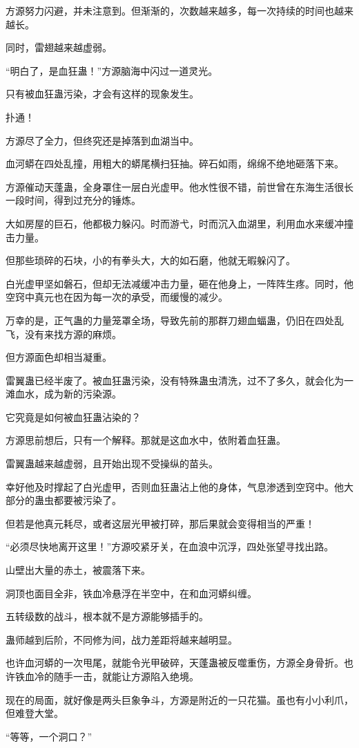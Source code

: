 \begin{this_body}
方源努力闪避，并未注意到。但渐渐的，次数越来越多，每一次持续的时间也越来越长。

同时，雷翅越来越虚弱。

“明白了，是血狂蛊！”方源脑海中闪过一道灵光。

只有被血狂蛊污染，才会有这样的现象发生。

扑通！

方源尽了全力，但终究还是掉落到血湖当中。

血河蟒在四处乱撞，用粗大的蟒尾横扫狂抽。碎石如雨，绵绵不绝地砸落下来。

方源催动天蓬蛊，全身罩住一层白光虚甲。他水性很不错，前世曾在东海生活很长一段时间，得到过充分的锤炼。

大如房屋的巨石，他都极力躲闪。时而游弋，时而沉入血湖里，利用血水来缓冲撞击力量。

但那些琐碎的石块，小的有拳头大，大的如石磨，他就无暇躲闪了。

白光虚甲坚如磐石，但却无法减缓冲击力量，砸在他身上，一阵阵生疼。同时，他空窍中真元也在因为每一次的承受，而缓慢的减少。

万幸的是，正气蛊的力量笼罩全场，导致先前的那群刀翅血蝠蛊，仍旧在四处乱飞，没有来找方源的麻烦。

但方源面色却相当凝重。

雷翼蛊已经半废了。被血狂蛊污染，没有特殊蛊虫清洗，过不了多久，就会化为一滩血水，成为新的污染源。

它究竟是如何被血狂蛊沾染的？

方源思前想后，只有一个解释。那就是这血水中，依附着血狂蛊。

雷翼蛊越来越虚弱，且开始出现不受操纵的苗头。

幸好他及时撑起了白光虚甲，否则血狂蛊沾上他的身体，气息渗透到空窍中。他大部分的蛊虫都要被污染了。

但若是他真元耗尽，或者这层光甲被打碎，那后果就会变得相当的严重！

“必须尽快地离开这里！”方源咬紧牙关，在血浪中沉浮，四处张望寻找出路。

山壁出大量的赤土，被震落下来。

洞顶也面目全非，铁血冷悬浮在半空中，在和血河蟒纠缠。

五转级数的战斗，根本就不是方源能够插手的。

蛊师越到后阶，不同修为间，战力差距将越来越明显。

也许血河蟒的一次甩尾，就能令光甲破碎，天蓬蛊被反噬重伤，方源全身骨折。也许铁血冷的随手一击，就能让方源陷入绝境。

现在的局面，就好像是两头巨象争斗，方源是附近的一只花猫。虽也有小小利爪，但难登大堂。

“等等，一个洞口？”

\end{this_body}


